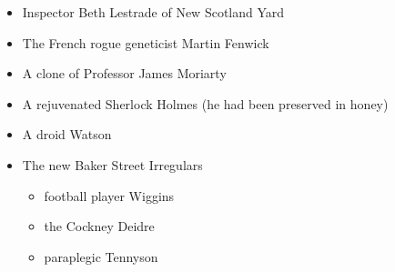 \documentclass[a4paper,landscape,headrule,footrule,xetex]{foils}
\begin{document}
\begin{itemize}
\item Inspector Beth Lestrade of New Scotland Yard 
\item The French rogue geneticist Martin Fenwick
\item A clone of Professor James Moriarty
\item A rejuvenated Sherlock Holmes (he had been preserved in honey)
\item A   droid Watson
\item The new Baker Street Irregulars
  \begin{itemize}
  \item football player Wiggins
  \item the Cockney Deidre
  \item paraplegic Tennyson
  \end{itemize}
\end{itemize}
\end{document}
